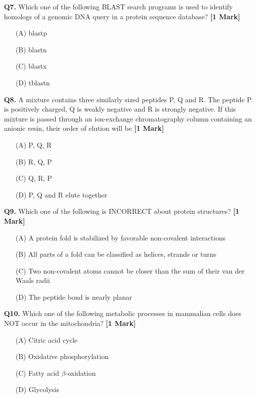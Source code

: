 \documentclass[11pt]{article}
\newcommand{\questiona}[2]{
    \noindent\textbf{Q#2.} #1 \hfill \textbf{[1 Mark]}
}
\begin{document}
\questiona{Which one of the following BLAST search programs is used to identify homologs of a genomic DNA query in a protein sequence database?}{7}
\begin{enumerate}
    \item[(A)] blastp  
    \item[(B)] blastn  
    \item[(C)] blastx  
    \item[(D)] tblastn  
\end{enumerate}
\vspace{0.5cm}

\questiona{A mixture contains three similarly sized peptides P, Q and R. The peptide P is positively charged, Q is weakly negative and R is strongly negative. If this mixture is passed through an ion-exchange chromatography column containing an anionic resin, their order of elution will be}{8}
\begin{enumerate}
    \item[(A)] P, Q, R  
    \item[(B)] R, Q, P  
    \item[(C)] Q, R, P  
    \item[(D)] P, Q and R elute together  
\end{enumerate}
\vspace{0.5cm}

\questiona{Which one of the following is INCORRECT about protein structures?}{9}
\begin{enumerate}
    \item[(A)] A protein fold is stabilized by favorable non-covalent interactions  
    \item[(B)] All parts of a fold can be classified as helices, strands or turns  
    \item[(C)] Two non-covalent atoms cannot be closer than the sum of their van der Waals radii  
    \item[(D)] The peptide bond is nearly planar  
\end{enumerate}
\vspace{0.5cm}

\questiona{Which one of the following metabolic processes in mammalian cells does NOT occur in the mitochondria?}{10}
\begin{enumerate}
    \item[(A)] Citric acid cycle  
    \item[(B)] Oxidative phosphorylation  
    \item[(C)] Fatty acid $\beta$-oxidation  
    \item[(D)] Glycolysis  
\end{enumerate}
\vspace{0.5cm}
\end{document}
